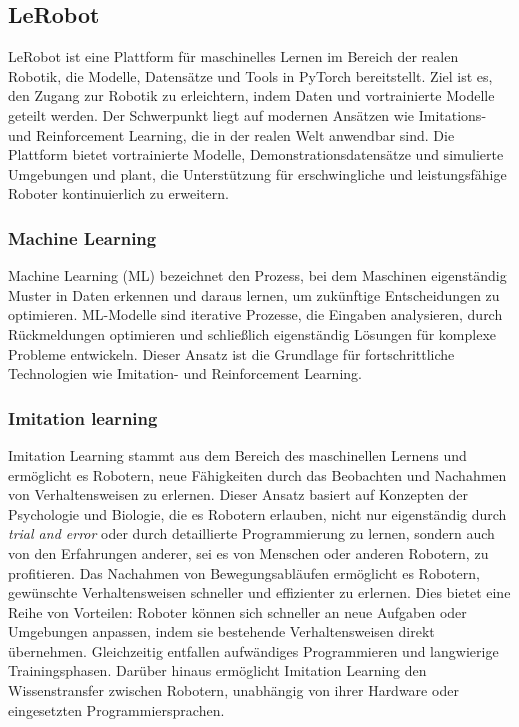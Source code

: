 \documentclass[a4paper, 12pt]{article}
\begin{document}
\subsection{LeRobot} \label{lerobot}
LeRobot ist eine Plattform für maschinelles Lernen im Bereich der realen Robotik, die Modelle, Datensätze und Tools in PyTorch bereitstellt. Ziel ist es, den Zugang zur Robotik zu erleichtern, indem Daten und vortrainierte Modelle geteilt werden. Der Schwerpunkt liegt auf modernen Ansätzen wie Imitations- und Reinforcement Learning, die in der realen Welt anwendbar sind. Die Plattform bietet vortrainierte Modelle, Demonstrationsdatensätze und simulierte Umgebungen und plant, die Unterstützung für erschwingliche und leistungsfähige Roboter kontinuierlich zu erweitern. \cite{cadene2024lerobot}

\subsubsection{Machine Learning} \label{machine_learning}
Machine Learning (ML) bezeichnet den Prozess, bei dem Maschinen eigenständig Muster in Daten erkennen und daraus lernen, um zukünftige Entscheidungen zu optimieren. ML-Modelle sind iterative Prozesse, die Eingaben analysieren, durch Rückmeldungen optimieren und schließlich eigenständig Lösungen für komplexe Probleme entwickeln. Dieser Ansatz ist die Grundlage für fortschrittliche Technologien wie Imitation- und Reinforcement Learning. \cite{grundlagen_sw_entwicklung} 

\subsubsection{Imitation learning} \label{imitation_learning}
Imitation Learning stammt aus dem Bereich des maschinellen Lernens und ermöglicht es  Robotern, neue Fähigkeiten durch das Beobachten und Nachahmen von Verhaltensweisen zu erlernen. Dieser Ansatz basiert auf Konzepten der Psychologie und Biologie, die es Robotern erlauben, nicht nur eigenständig durch \textit{trial and error} oder durch detaillierte Programmierung zu lernen, sondern auch von den Erfahrungen anderer, sei es von Menschen oder anderen Robotern, zu profitieren.
Das Nachahmen von Bewegungsabläufen ermöglicht es Robotern, gewünschte Verhaltensweisen schneller und effizienter zu erlernen. Dies bietet eine Reihe von Vorteilen: Roboter können sich schneller an neue Aufgaben oder Umgebungen anpassen, indem sie bestehende Verhaltensweisen direkt übernehmen. Gleichzeitig entfallen aufwändiges Programmieren und langwierige Trainingsphasen. Darüber hinaus ermöglicht Imitation Learning den Wissenstransfer zwischen Robotern, unabhängig von ihrer Hardware oder eingesetzten Programmiersprachen. \cite{robot_imitating}
\end{document}
